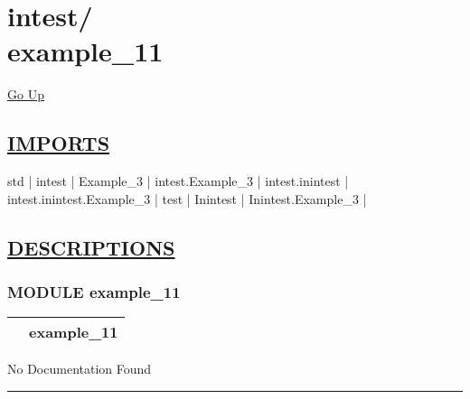 \chapter*{\color{headfile}
{\large intest\slash\hspace{0pt}}
 \\
example_11
}
\hypertarget{ecldoc:toc:intest.example_11}{}
\hyperlink{ecldoc:toc:root/intest}{Go Up}

\section*{\underline{\textsf{IMPORTS}}}
\begin{doublespace}
{\large
std |
intest |
Example\_3 |
intest.Example\_3 |
intest.inintest |
intest.inintest.Example\_3 |
test |
Inintest |
Inintest.Example\_3 |
}
\end{doublespace}

\section*{\underline{\textsf{DESCRIPTIONS}}}
\subsection*{\textsf{\colorbox{headtoc}{\color{white} MODULE}
example\_11}}

\hypertarget{ecldoc:intest.example_11}{}

{\renewcommand{\arraystretch}{1.5}
\begin{tabularx}{\textwidth}{|>{\raggedright\arraybackslash}l|X|}
\hline
\hspace{0pt}\mytexttt{\color{red} } & \textbf{example\_11} \\
\hline
\end{tabularx}
}

\par





No Documentation Found







\rule{\linewidth}{0.5pt}
